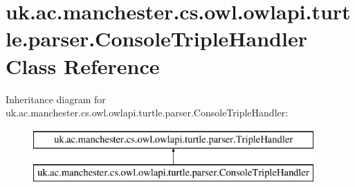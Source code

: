 \hypertarget{classuk_1_1ac_1_1manchester_1_1cs_1_1owl_1_1owlapi_1_1turtle_1_1parser_1_1_console_triple_handler}{\section{uk.\-ac.\-manchester.\-cs.\-owl.\-owlapi.\-turtle.\-parser.\-Console\-Triple\-Handler Class Reference}
\label{classuk_1_1ac_1_1manchester_1_1cs_1_1owl_1_1owlapi_1_1turtle_1_1parser_1_1_console_triple_handler}
}
Inheritance diagram for uk.\-ac.\-manchester.\-cs.\-owl.\-owlapi.\-turtle.\-parser.\-Console\-Triple\-Handler\-:\begin{figure}[H]
\begin{center}
\leavevmode
\includegraphics[height=2.000000cm]{classuk_1_1ac_1_1manchester_1_1cs_1_1owl_1_1owlapi_1_1turtle_1_1parser_1_1_console_triple_handler}
\end{center}
\end{figure}
